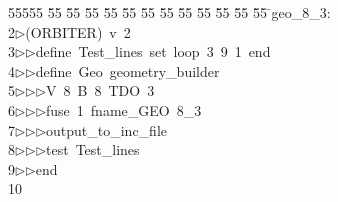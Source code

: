 %
%
\begin{tabbing}
55555 \= 55 \= 55 \= 55 \= 55 \= 55 \= 55 \= 55 \= 55 \= 55 \= 55 \= 55 \= 55 \= \>geo\_8\_3:\\[0pt]
2\>$\triangleright$\>(ORBITER)\ v\ 2\ \\[0pt]
3\>$\triangleright$\>$\triangleright$\>define\ Test\_lines\ set\ loop\ 3\ 9\ 1\ end\ \\[0pt]
4\>$\triangleright$\>$\triangleright$\>define\ Geo\ geometry\_builder\ \\[0pt]
5\>$\triangleright$\>$\triangleright$\>$\triangleright$\>V\ 8\ B\ 8\ TDO\ 3\ \\[0pt]
6\>$\triangleright$\>$\triangleright$\>$\triangleright$\>fuse\ 1\ fname\_GEO\ 8\_3\ \\[0pt]
7\>$\triangleright$\>$\triangleright$\>$\triangleright$\>output\_to\_inc\_file\ \\[0pt]
8\>$\triangleright$\>$\triangleright$\>$\triangleright$\>test\ Test\_lines\ \\[0pt]
9\>$\triangleright$\>$\triangleright$\>end\\[0pt]
10\>\end{tabbing}
